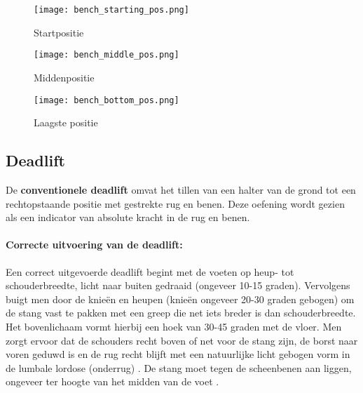 \begin{figure}[h]
  \centering
  \begin{minipage}[t]{0.32\textwidth}
    \centering
    \texttt{[image: bench\_starting\_pos.png]}
    \caption[Startpositie bench press]{\label{fig:bench_startpositie} Startpositie \autocite{Ronai2018}}
  \end{minipage}
  \hfill
  \begin{minipage}[t]{0.32\textwidth}
    \centering
    \texttt{[image: bench\_middle\_pos.png]}
    \caption[Middenste positie bench press]{\label{fig:bench_middenpositie} Middenpositie \autocite{Ronai2018}}
  \end{minipage}
  \hfill
  \begin{minipage}[t]{0.32\textwidth}
    \centering
    \texttt{[image: bench\_bottom\_pos.png]}
    \caption[Onderste positie bench press]{\label{fig:bench_onderpositie} Laagste positie \autocite{Ronai2018}}
  \end{minipage}
\end{figure}

\subsection{Deadlift}
\label{subsec:deadlift}
De \textbf{conventionele deadlift} omvat het tillen van een halter van de grond tot een rechtopstaande positie met gestrekte rug en benen. 
Deze oefening wordt gezien als een indicator van absolute kracht in de rug en benen.

\paragraph{Correcte uitvoering van de deadlift:}
Een correct uitgevoerde deadlift begint met de voeten op heup- tot schouderbreedte, licht naar buiten gedraaid (ongeveer 10-15 graden). 
Vervolgens buigt men door de knieën en heupen (knieën ongeveer 20-30 graden gebogen) om de stang vast te pakken met een greep die net iets breder is dan schouderbreedte. 
Het bovenlichaam vormt hierbij een hoek van 30-45 graden met de vloer. 
Men zorgt ervoor dat de schouders recht boven of net voor de stang zijn, de borst naar voren geduwd is en de rug recht blijft met een natuurlijke licht gebogen vorm in de lumbale lordose (onderrug) \autocite{BirdEtAl2010}. 
De stang moet tegen de scheenbenen aan liggen, ongeveer ter hoogte van het midden van de voet \autocite{Ronai2020}.

